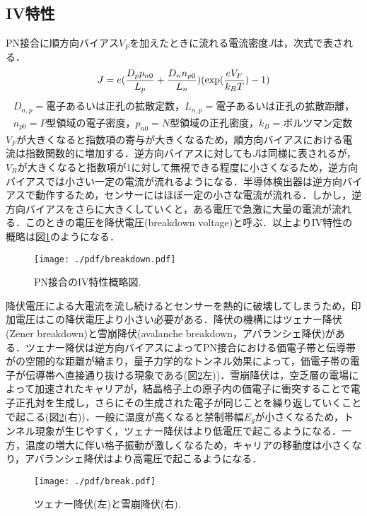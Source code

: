 \subsection{IV特性}
\label{sub:iviv}
PN接合に順方向バイアス$V_{F}$を加えたときに流れる電流密度$J$は，次式で表される．
\begin{eqnarray*}
J=e(\frac{D_{p}p_{n0}}{L_{p}}+\frac{D_{n}n_{p0}}{L_{n}})({\rm exp}(\frac{eV_{F}}{k_{B}T})-1)
\end{eqnarray*}
\begin{eqnarray*}
D_{n,p}=電子あるいは正孔の拡散定数，L_{n,p}=電子あるいは正孔の拡散距離，\\
n_{p0}=P型領域の電子密度，p_{n0}=N型領域の正孔密度，k_{B}=ボルツマン定数
\end{eqnarray*}
$V_{F}$が大きくなると指数項の寄与が大きくなるため，順方向バイアスにおける電流は指数関数的に増加する．逆方向バイアスに対しても$J$は同様に表されるが，$V_{R}$が大きくなると指数項が1に対して無視できる程度に小さくなるため，逆方向バイアスでは小さい一定の電流が流れるようになる．半導体検出器は逆方向バイアスで動作するため，センサーにはほぼ一定の小さな電流が流れる．しかし，逆方向バイアスをさらに大きくしていくと，ある電圧で急激に大量の電流が流れる．このときの電圧を降伏電圧(breakdown voltage)と呼ぶ．以上よりIV特性の概略は図\ref{fig:IVbreak}のようになる．\par
\begin{figure}[H]
	\centering
	\texttt{[image: ./pdf/breakdown.pdf]}
	\caption{PN接合のIV特性概略図.}
	\label{fig:IVbreak}
\end{figure}
降伏電圧による大電流を流し続けるとセンサーを熱的に破壊してしまうため，印加電圧はこの降伏電圧より小さい必要がある．降伏の機構にはツェナー降伏(Zener breakdown)と雪崩降伏(avalanche breakdown，アバランシェ降伏)がある．ツェナー降伏は逆方向バイアスによってPN接合における価電子帯と伝導帯がの空間的な距離が縮まり，量子力学的なトンネル効果によって，価電子帯の電子が伝導帯へ直接通り抜ける現象である(図\ref{fig:break}左))．雪崩降伏は，空乏層の電場によって加速されたキャリアが，結晶格子上の原子内の価電子に衝突することで電子正孔対を生成し，さらにその生成された電子が同じことを繰り返していくことで起こる(図\ref{fig:break}(右))．一般に温度が高くなると禁制帯幅$E_{g}$が小さくなるため，トンネル現象が生じやすく，ツェナー降伏はより低電圧で起こるようになる．一方，温度の増大に伴い格子振動が激しくなるため，キャリアの移動度は小さくなり，アバランシェ降伏はより高電圧で起こるようになる．
\begin{figure}[H]
	\centering
	\texttt{[image: ./pdf/break.pdf]}
	\caption{ツェナー降伏(左)と雪崩降伏(右).}
	\label{fig:break}
\end{figure}
